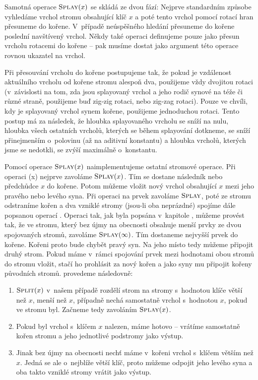 Samotná operace $\ope{Splay}(x)$ se skládá ze dvou fází: Nejprve standardním způsobe
vyhledáme vrchol stromu obsahující klíč $x$ a poté tento vrchol pomocí rotací
hran přesuneme do kořene. V~případě neúspěšného hledání přesuneme do kořene poslední navštívený vrchol. Někdy také operaci  definujeme pouze jako přesun vrcholu rotacemi do kořene -- pak musíme dostat jako argument této operace rovnou ukazatel na vrchol.

Při přesouvání vrcholu do kořene postupujeme tak, že
pokud je vzdálenost aktuálního vrcholu od kořene stromu alespoň dva, použijeme
vždy dvojitou rotaci (v~závislosti na tom, zda jsou splayovaný vrchol a jeho
rodič synové na téže či různé straně, použijeme buď zig-zig rotaci, nebo zig-zag
rotaci). Pouze ve chvíli, kdy je splayovaný vrchol synem kořene, použijeme
jednoduchou rotaci. Tento postup má za následek, že hloubka splayovaného vrcholu se sníží na nulu, hloubka všech ostatních vrcholů, kterých se během splayování dotkneme, se sníží přinejmenším o~polovinu (až na aditivní konstantu) a hloubka vrcholů, kterých jsme se nedotkli, se zvýší maximálně o~konstantu.

Pomocí operace $\ope{Splay}(x)$ naimplementujeme ostatní stromové operace. Při operaci (x) nejprve zavoláme $\ope{Splay}(x)$. Tím se dostane následník nebo předchůdce $x$ do kořene. Potom můžeme vložit nový vrchol obsahující $x$ mezi jeho pravého nebo levého syna. Při operaci  na prvek zavoláme $\ope{Splay}$, poté ze stromu odstraníme kořen a dva vzniklé stromy (jsou-li oba neprázdné)  spojíme dále popsanou operací . Operaci  tak, jak byla popsána v~kapitole , můžeme provést tak, že ve stromu, který bez újmy na obecnosti obsahuje menší prvky ze dvou spojovaných stromů, zavoláme $\ope{Splay}(\infty)$. Tím dostaneme nejvyšší prvek do kořene. Kořeni proto bude chybět pravý syn. Na jeho místo tedy můžeme připojit druhý strom. Pokud máme v~rámci spojování prvek mezi hodnotami obou stromů do stromu vložit, stačí ho prohlásit za nový kořen a jako syny mu připojit kořeny původních stromů.  provedeme následovně:

\begin{enumerate}
\item $\ope{Split}(x)$ v~našem případě rozdělí strom na stromy s~hodnotou klíče větší než $x$, menší než $x$, případně nechá samostatně vrchol s~hodnotou $x$, pokud ve stromu byl. Začneme tedy zavoláním $\ope{Splay}(x)$.
\item Pokud byl vrchol s~klíčem $x$ nalezen, máme hotovo -- vrátíme samostatně kořen stromu a jeho jednotlivé podstromy jako výstup.
\item Jinak bez újmy na obecnosti nechť máme v~kořeni vrchol s~klíčem větším než $x$. Jedná se ale o~nejblíže větší klíč, proto můžeme odpojit jeho levého syna a oba takto vzniklé stromy vrátit jako výstup.
\end{enumerate}

